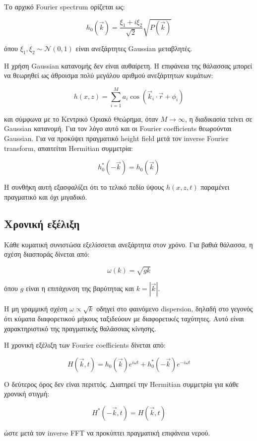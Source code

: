 \documentclass[a4paper, 11pt]{article}
\begin{document}
Το αρχικό Fourier spectrum ορίζεται ως:

\[
h_0(\vec{k})
=
\frac{\xi_1 + i\xi_2}{\sqrt{2}}
\sqrt{P(\vec{k})}
\]

όπου \(\xi_1,\xi_2 \sim \mathcal N(0,1)\) είναι ανεξάρτητες Gaussian
μεταβλητές.

Η χρήση Gaussian κατανομής δεν είναι αυθαίρετη. Η επιφάνεια της θάλασσας
μπορεί να θεωρηθεί ως άθροισμα πολύ μεγάλου αριθμού ανεξάρτητων κυμάτων:

\[
h(x,z)
=
\sum_{i=1}^{M}
a_i
\cos(\vec{k}_i\cdot\vec{r}+\phi_i)
\]

και σύμφωνα με το Κεντρικό Οριακό Θεώρημα, όταν \(M \to \infty\), η
διαδικασία τείνει σε Gaussian κατανομή. Για τον λόγο αυτό και οι Fourier
coefficients θεωρούνται Gaussian. Για να προκύψει πραγματικό height
field μετά τον inverse Fourier transform, απαιτείται Hermitian
συμμετρία:

\[
h_0^*(-\vec{k}) = h_0(\vec{k})
\]

Η συνθήκη αυτή εξασφαλίζει ότι το τελικό πεδίο ύψους \(h(x,z,t)\)
παραμένει πραγματικό και όχι μιγαδικό.

\subsection{Χρονική
εξέλιξη}\label{ux3c7ux3c1ux3bfux3bdux3b9ux3baux3ae-ux3b5ux3beux3adux3bbux3b9ux3beux3b7}

Κάθε κυματική συνιστώσα εξελίσσεται ανεξάρτητα στον χρόνο. Για βαθιά
θάλασσα, η σχέση διασποράς δίνεται από:

\[
\omega(k)=\sqrt{gk}
\]

όπου \(g\) είναι η επιτάχυνση της βαρύτητας και \(k = |\vec{k}|\).

Η μη γραμμική σχέση \(\omega \propto \sqrt{k}\) οδηγεί στο φαινόμενο
dispersion, δηλαδή στο γεγονός ότι κύματα διαφορετικού μήκους ταξιδεύουν
με διαφορετικές ταχύτητες. Αυτό είναι χαρακτηριστικό της πραγματικής
θαλάσσιας κίνησης.

Η χρονική εξέλιξη των Fourier coefficients δίνεται από:

\[
H(\vec{k},t)
=
h_0(\vec{k})e^{i\omega t}
+
h_0^*(-\vec{k})e^{-i\omega t}
\]

Ο δεύτερος όρος δεν είναι περιττός. Διατηρεί την Hermitian συμμετρία για
κάθε χρονική στιγμή:

\[
H^*(-\vec{k},t)=H(\vec{k},t)
\]

ώστε μετά τον inverse FFT να προκύπτει πραγματική επιφάνεια νερού.
\end{document}
